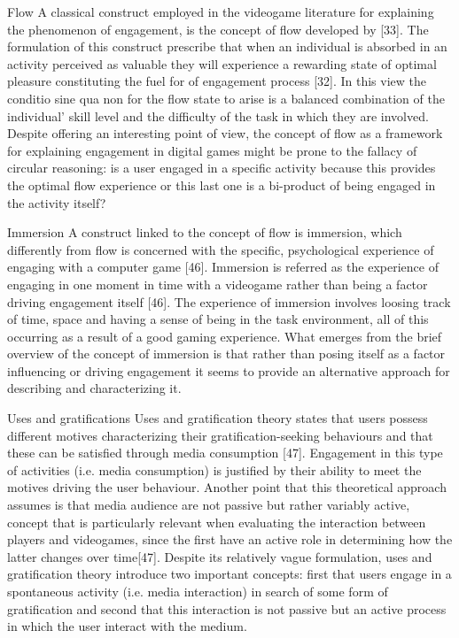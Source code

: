 Flow
A classical construct employed in the videogame literature for explaining the phenomenon of engagement, is the concept of flow developed by [33]. The formulation of this construct prescribe that when an individual is absorbed in an activity perceived as valuable they will experience a rewarding state of optimal pleasure constituting the fuel for of  engagement process [32]. In this view the conditio sine qua non for the flow state to arise is a balanced combination of the individual’ skill level and the difficulty of the task in which they are involved. Despite offering an interesting point of view, the concept of flow as a framework for explaining engagement in digital games might be prone to the fallacy of circular reasoning: is a user engaged in a specific activity because this provides the optimal flow experience or this last one is a bi-product of being engaged in the activity itself? 

Immersion
A construct linked to the concept of flow is immersion, which differently from flow is concerned with the specific, psychological experience of engaging with a computer game [46]. Immersion is referred as the experience of engaging in one moment in time with a videogame rather than being a factor driving engagement itself [46]. The experience of immersion involves loosing track of time, space and having a sense of being in the task environment, all of this occurring as a result of a good gaming experience. What emerges from the brief overview of the concept of immersion is that rather than posing itself as a factor influencing or driving engagement it seems to provide an alternative approach for describing and characterizing it.

Uses and gratifications
Uses and gratification theory states that users possess different motives characterizing their gratification-seeking behaviours and that these can be satisfied through media consumption [47]. Engagement in this type of activities (i.e. media consumption) is justified by their ability to meet the motives driving the user behaviour. Another point that this theoretical approach assumes is that media audience are not passive but rather variably active, concept that is particularly relevant when evaluating the interaction between players and videogames, since the first have an active role in determining how the latter changes over time[47]. Despite its relatively vague formulation, uses and gratification theory introduce two important concepts: first that users engage in a spontaneous activity (i.e. media interaction) in search of some form of gratification and second that this interaction is not passive but an active process in which the user interact with the medium.

